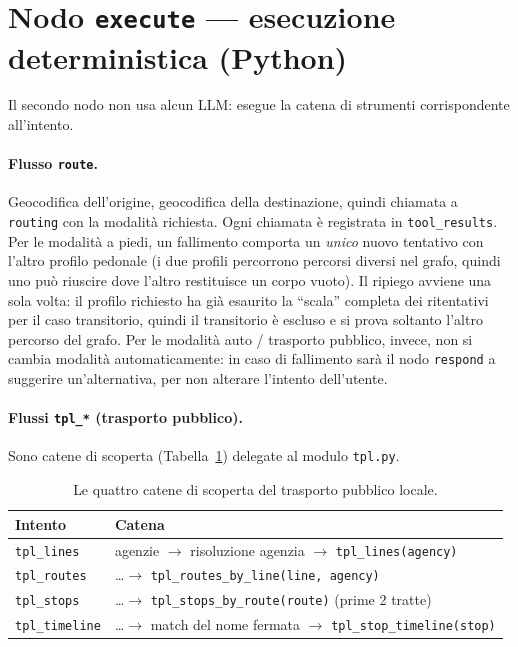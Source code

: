 \documentclass[11pt,a4paper]{article}
\begin{document}
\section{Nodo \texttt{execute} --- esecuzione deterministica (Python)}
Il secondo nodo non usa alcun LLM: esegue la catena di strumenti corrispondente
all'intento.

\paragraph{Flusso \texttt{route}.} Geocodifica dell'origine, geocodifica della
destinazione, quindi chiamata a \texttt{routing} con la modalità richiesta. Ogni
chiamata è registrata in \texttt{tool\_results}. Per le modalità a piedi, un
fallimento comporta un \emph{unico} nuovo tentativo con l'altro profilo pedonale
(i due profili percorrono percorsi diversi nel grafo, quindi uno può riuscire
dove l'altro restituisce un corpo vuoto). Il ripiego avviene una sola volta: il
profilo richiesto ha già esaurito la ``scala'' completa dei ritentativi per il
caso transitorio, quindi il transitorio è escluso e si prova soltanto l'altro
percorso del grafo. Per le modalità auto / trasporto pubblico, invece, non si
cambia modalità automaticamente: in caso di fallimento sarà il nodo
\texttt{respond} a suggerire un'alternativa, per non alterare l'intento
dell'utente.

\paragraph{Flussi \texttt{tpl\_*} (trasporto pubblico).} Sono catene di scoperta
(Tabella~\ref{tab:tpl}) delegate al modulo \texttt{tpl.py}.

\begin{table}[h]
\centering
\begin{tabular}{ll}
\toprule
\textbf{Intento} & \textbf{Catena} \\
\midrule
\texttt{tpl\_lines}    & agenzie $\rightarrow$ risoluzione agenzia $\rightarrow$ \texttt{tpl\_lines(agency)} \\
\texttt{tpl\_routes}   & \dots $\rightarrow$ \texttt{tpl\_routes\_by\_line(line, agency)} \\
\texttt{tpl\_stops}    & \dots $\rightarrow$ \texttt{tpl\_stops\_by\_route(route)} (prime 2 tratte) \\
\texttt{tpl\_timeline} & \dots $\rightarrow$ match del nome fermata $\rightarrow$ \texttt{tpl\_stop\_timeline(stop)} \\
\bottomrule
\end{tabular}
\caption{Le quattro catene di scoperta del trasporto pubblico locale.}
\label{tab:tpl}
\end{table}
\end{document}
